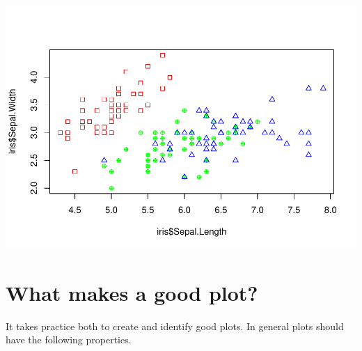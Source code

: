 \documentclass[
]{book}
\begin{document}
\includegraphics{_main_files/figure-latex/unnamed-chunk-190-1.pdf}

\hypertarget{what-makes-a-good-plot}{%
\section{What makes a good plot?}\label{what-makes-a-good-plot}}

It takes practice both to create and identify good plots. In general plots should have the following properties.
\end{document}
